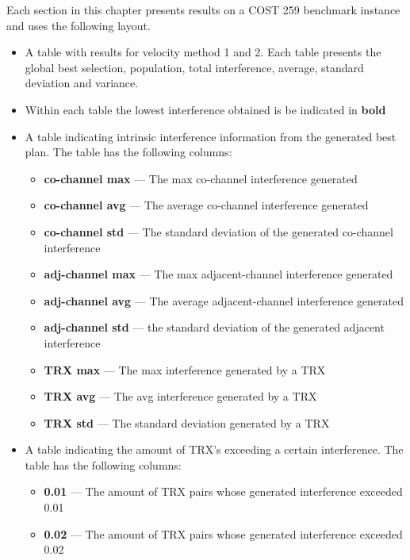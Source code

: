 Each section in this chapter presents results on a \gls{COST} 259 benchmark instance and uses the following layout.
\begin{itemize}
        \item A table with results for velocity method 1 and 2. Each table presents the global best selection, population, total interference, average, standard deviation and variance.
        \item Within each table the lowest interference obtained is be indicated in \textbf{bold}
        \item A table indicating intrinsic interference information from the generated best plan. The table has the following columns:
            \begin{itemize}
                \item{\textbf{co-channel max}} --- The max co-channel interference generated
                \item{\textbf{co-channel avg}} --- The average co-channel interference generated
                \item{\textbf{co-channel std}} --- The standard deviation of the generated co-channel interference
                \item{\textbf{adj-channel max}} --- The max adjacent-channel interference generated
                \item{\textbf{adj-channel avg}} --- The average adjacent-channel interference generated
                \item{\textbf{adj-channel std}} --- the standard deviation of the generated adjacent interference
                \item{\textbf{TRX max}} --- The max interference generated by a TRX
                \item{\textbf{TRX avg}} --- The avg interference generated by a TRX
                \item{\textbf{TRX std}} --- The standard deviation generated by a TRX
            \end{itemize}
        \item A table indicating the amount of TRX's exceeding a certain interference. The table has the following columns:
            \begin{itemize}
                \item{\textbf{0.01}} --- The amount of TRX pairs whose generated interference exceeded 0.01
                \item{\textbf{0.02} }--- The amount of TRX pairs whose generated interference exceeded 0.02

\end{itemize}
\end{itemize}
